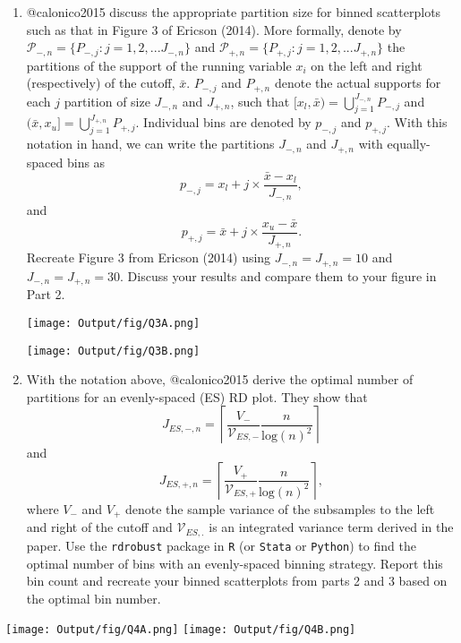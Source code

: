 \documentclass[
  12pt,
]{article}
\begin{document}
\begin{enumerate}
\def\labelenumi{\arabic{enumi}.}
\setcounter{enumi}{2}
\item
  @calonico2015 discuss the appropriate partition size for binned
  scatterplots such as that in Figure 3 of Ericson (2014). More
  formally, denote by
  \(\mathcal{P}_{-,n} = \{ P_{-,j} : j=1, 2, ... J_{-, n} \}\) and
  \(\mathcal{P}_{+,n} = \{ P_{+,j} : j=1, 2, ... J_{+, n} \}\) the
  partitions of the support of the running variable \(x_{i}\) on the
  left and right (respectively) of the cutoff, \(\bar{x}\). \(P_{-, j}\)
  and \(P_{+, n}\) denote the actual supports for each \(j\) partition
  of size \(J_{-,n}\) and \(J_{+,n}\), such that
  \([x_{l}, \bar{x}) = \bigcup_{j=1}^{J_{-,n}} P_{-, j}\) and
  \((\bar{x}, x_{u}] = \bigcup_{j=1}^{J_{+,n}} P_{+, j}\). Individual
  bins are denoted by \(p_{-,j}\) and \(p_{+,j}\). With this notation in
  hand, we can write the partitions \(J_{-,n}\) and \(J_{+,n}\) with
  equally-spaced bins as
  \[p_{-,j}=x_{l} + j \times \frac{\bar{x} - x_{l}}{J_{-,n}},\] and
  \[p_{+,j} = \bar{x} + j \times \frac{x_{u} - \bar{x}}{J_{+,n}}.\]
  Recreate Figure 3 from Ericson (2014) using \(J_{-,n}=J_{+,n}=10\) and
  \(J_{-,n}=J_{+,n}=30\). Discuss your results and compare them to your
  figure in Part 2.

  \texttt{[image: Output/fig/Q3A.png]}

  \texttt{[image: Output/fig/Q3B.png]}
\item
  With the notation above, @calonico2015 derive the optimal number of
  partitions for an evenly-spaced (ES) RD plot. They show that
  \[J_{ES,-,n} = \left\lceil \frac{V_{-}}{\mathcal{V}_{ES,-}} \frac{n}{\text{log}(n)^{2}} \right\rceil\]
  and
  \[J_{ES,+,n} = \left\lceil \frac{V_{+}}{\mathcal{V}_{ES,+}} \frac{n}{\text{log}(n)^{2}} \right\rceil,\]
  where \(V_{-}\) and \(V_{+}\) denote the sample variance of the
  subsamples to the left and right of the cutoff and
  \(\mathcal{V}_{ES,.}\) is an integrated variance term derived in the
  paper. Use the \texttt{rdrobust} package in \texttt{R} (or
  \texttt{Stata} or \texttt{Python}) to find the optimal number of bins
  with an evenly-spaced binning strategy. Report this bin count and
  recreate your binned scatterplots from parts 2 and 3 based on the
  optimal bin number.
\end{enumerate}

\texttt{[image: Output/fig/Q4A.png]}
\texttt{[image: Output/fig/Q4B.png]} \pagebreak
\end{document}
